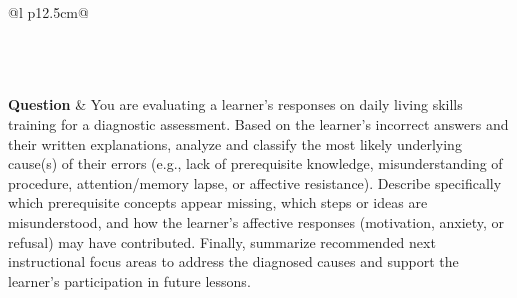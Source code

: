 \begin{longtable}{@{}l p{12.5cm}@{}}
  \caption{Skills per-instance answer comparison for the 15 most divergent items: same question, each model's answer and reasoning.}\label{tab:cmp_skills} \\
  \toprule
  \endfirsthead
  \toprule
  \endhead
   \\
  \midrule
   \\
  \textbf{Question} & You are evaluating a learner's responses on daily living skills training for a diagnostic assessment. Based on the learner's incorrect answers and their written explanations, analyze and classify the most likely underlying cause(s) of their errors (e.g., lack of prerequisite knowledge, misunderstanding of procedure, attention/memory lapse, or affective resistance). Describe specifically which prerequisite concepts appear missing, which steps or ideas are misunderstood, and how the learner's affective responses (motivation, anxiety, or refusal) may have contributed. Finally, summarize recommended next instructional focus areas to address the diagnosed causes and support the learner's participation in future lessons. \\

\end{longtable}
